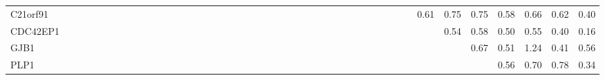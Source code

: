 \begin{longtable}{lrrrrrrrrrrrrrrrrrrrrrrrrrrrrrrrrrrrrrrrrrrr}
C21orf91 &               &            &            &              &              &          &              &              &            &            &               &              &           &             &            &             &               &              &               &             &               &              &             &              &               &              &             &            &            &             &           &             &              &           &            &                &           0.61 &       0.75 &       0.75 &         0.58 &       0.66 &         0.62 &          0.40 \\
CDC42EP1 &               &            &            &              &              &          &              &              &            &            &               &              &           &             &            &             &               &              &               &             &               &              &             &              &               &              &             &            &            &             &           &             &              &           &            &                &                &       0.54 &       0.58 &         0.50 &       0.55 &         0.40 &          0.16 \\
GJB1     &               &            &            &              &              &          &              &              &            &            &               &              &           &             &            &             &               &              &               &             &               &              &             &              &               &              &             &            &            &             &           &             &              &           &            &                &                &            &       0.67 &         0.51 &       1.24 &         0.41 &          0.56 \\
PLP1     &               &            &            &              &              &          &              &              &            &            &               &              &           &             &            &             &               &              &               &             &               &              &             &              &               &              &             &            &            &             &           &             &              &           &            &                &                &            &            &         0.56 &       0.70 &         0.78 &          0.34 \\

\end{longtable}
